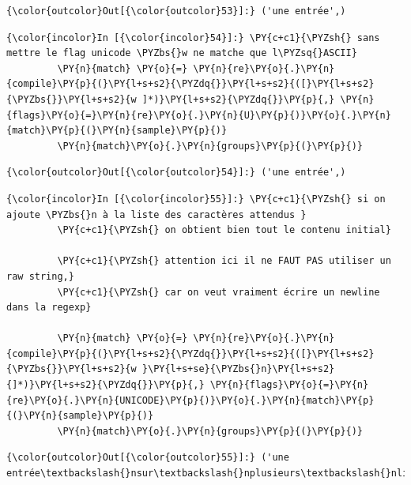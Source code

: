 \begin{Verbatim}[commandchars=\\\{\}]
{\color{outcolor}Out[{\color{outcolor}53}]:} ('une entrée',)
\end{Verbatim}
            
    \begin{Verbatim}[commandchars=\\\{\}]
{\color{incolor}In [{\color{incolor}54}]:} \PY{c+c1}{\PYZsh{} sans mettre le flag unicode \PYZbs{}w ne matche que l\PYZsq{}ASCII}
         \PY{n}{match} \PY{o}{=} \PY{n}{re}\PY{o}{.}\PY{n}{compile}\PY{p}{(}\PY{l+s+s2}{\PYZdq{}}\PY{l+s+s2}{([}\PY{l+s+s2}{\PYZbs{}}\PY{l+s+s2}{w ]*)}\PY{l+s+s2}{\PYZdq{}}\PY{p}{,} \PY{n}{flags}\PY{o}{=}\PY{n}{re}\PY{o}{.}\PY{n}{U}\PY{p}{)}\PY{o}{.}\PY{n}{match}\PY{p}{(}\PY{n}{sample}\PY{p}{)}
         \PY{n}{match}\PY{o}{.}\PY{n}{groups}\PY{p}{(}\PY{p}{)}
\end{Verbatim}


\begin{Verbatim}[commandchars=\\\{\}]
{\color{outcolor}Out[{\color{outcolor}54}]:} ('une entrée',)
\end{Verbatim}
            
    \begin{Verbatim}[commandchars=\\\{\}]
{\color{incolor}In [{\color{incolor}55}]:} \PY{c+c1}{\PYZsh{} si on ajoute \PYZbs{}n à la liste des caractères attendus }
         \PY{c+c1}{\PYZsh{} on obtient bien tout le contenu initial}
         
         \PY{c+c1}{\PYZsh{} attention ici il ne FAUT PAS utiliser un raw string,}
         \PY{c+c1}{\PYZsh{} car on veut vraiment écrire un newline dans la regexp}
         
         \PY{n}{match} \PY{o}{=} \PY{n}{re}\PY{o}{.}\PY{n}{compile}\PY{p}{(}\PY{l+s+s2}{\PYZdq{}}\PY{l+s+s2}{([}\PY{l+s+s2}{\PYZbs{}}\PY{l+s+s2}{w }\PY{l+s+se}{\PYZbs{}n}\PY{l+s+s2}{]*)}\PY{l+s+s2}{\PYZdq{}}\PY{p}{,} \PY{n}{flags}\PY{o}{=}\PY{n}{re}\PY{o}{.}\PY{n}{UNICODE}\PY{p}{)}\PY{o}{.}\PY{n}{match}\PY{p}{(}\PY{n}{sample}\PY{p}{)}
         \PY{n}{match}\PY{o}{.}\PY{n}{groups}\PY{p}{(}\PY{p}{)}
\end{Verbatim}


\begin{Verbatim}[commandchars=\\\{\}]
{\color{outcolor}Out[{\color{outcolor}55}]:} ('une entrée\textbackslash{}nsur\textbackslash{}nplusieurs\textbackslash{}nlignes\textbackslash{}n',)
\end{Verbatim}
            
